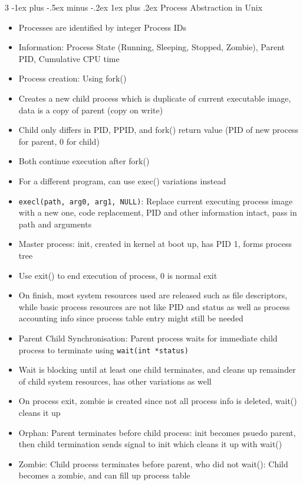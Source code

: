 \documentclass[10pt, landscape]{article}
\makeatletter
\renewcommand{\subsection}{\@startsection{subsection}{3}{0mm}%
                                {-1ex plus -.5ex minus -.2ex}%
                                {1ex plus .2ex}%
                                {\normalfont\small\bfseries}}%
\makeatother
\begin{document}
\begin{multicols*}{3}
\subsection{Process Abstraction in Unix}
\begin{itemize}
    \item Processes are identified by integer Process IDs
    \item Information: Process State (Running, Sleeping, Stopped, Zombie), Parent PID, Cumulative CPU time
    \item Process creation: Using fork()
    \item Creates a new child process which is duplicate of current executable image, data is a copy of parent (copy on write)
    \item Child only differs in PID, PPID, and fork() return value (PID of new process for parent, 0 for child)
    \item Both continue execution after fork()
    \item For a different program, can use exec() variations instead
    \item \verb|execl(path, arg0, arg1, NULL)|: Replace current executing process image with a new one, code replacement, PID and other information intact, pass in path and arguments
    \item Master process: init, created in kernel at boot up, has PID 1, forms process tree
    \item Use exit() to end execution of process, 0 is normal exit
    \item On finish, most system resources used are released such as file descriptors, while basic process resources are not like PID and status as well as process accounting info since process table entry might still be needed
    \item Parent Child Synchronisation: Parent process waits for immediate child process to terminate using \verb|wait(int *status)|
    \item Wait is blocking until at least one child terminates, and cleans up remainder of child system resources, has other variations as well
    \item On process exit, zombie is created since not all process info is deleted, wait() cleans it up
    \item Orphan: Parent terminates before child process: init becomes psuedo parent, then child termination sends signal to init which cleans it up with wait()
    \item Zombie: Child process terminates before parent, who did not wait(): Child becomes a zombie, and can fill up process table
\end{itemize}


\end{multicols*}
\end{document}
